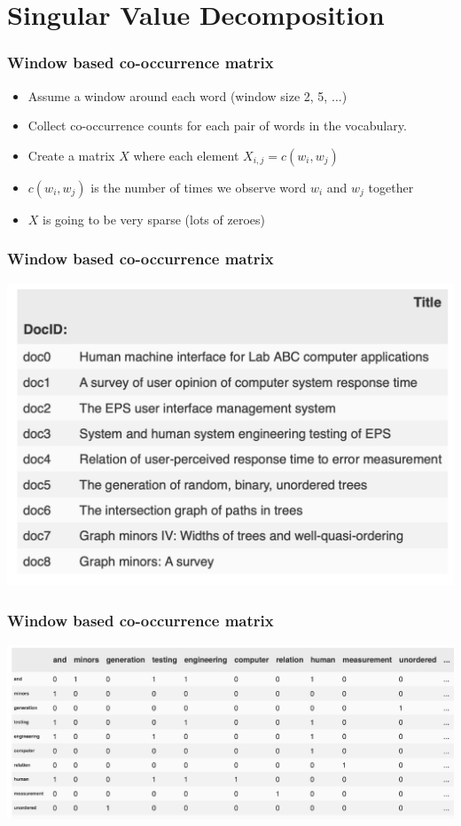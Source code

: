 \section{Singular Value Decomposition}
\frame{\tableofcontents[currentsection]}

\begin{frame}
\frametitle{Window based co-occurrence matrix}
\begin{itemize}[<+->]
\item Assume a window around each word (window size 2, 5, $\ldots$)
\item Collect co-occurrence counts for each pair of words in the vocabulary.
\item Create a matrix $X$ where each element $X_{i,j} = c(w_i, w_j)$
\item $c(w_i, w_j)$ is the number of times we observe word $w_i$ and $w_j$ together
\item $X$ is going to be very sparse (lots of zeroes)
\end{itemize}
\end{frame}

\begin{frame}
\frametitle{Window based co-occurrence matrix}
\begin{center}
\includegraphics[scale=.45]{figures/wordvectors/docs}	
\end{center}
\end{frame}

\begin{frame}
\frametitle{Window based co-occurrence matrix}
\begin{center}
\includegraphics[scale=.4]{figures/wordvectors/wcm}	
\end{center}
\end{frame}

